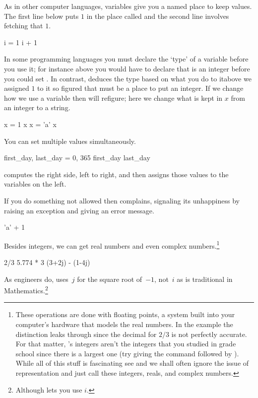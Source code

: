 As in other computer languages, 
variables give you a named place to keep values.
The first line below puts $1$ in the place called 
and the second line involves fetching that $1$.
\begin{pythonconsole}
i = 1
i + 1
\end{pythonconsole}
In some programming languages you must declare the `type' of a variable
before you use it; for instance above you would have to declare 
that  is an integer before you could set .
In contrast, \python{} deduces the type 
based on what you do to it\Dash above we assigned $1$ to it
so \python{} figured that  must be a place to put an integer.
If we change how we use a variable then \python{} will 
refigure; here we change what is kept in $x$ from an integer to a string.
\begin{pythonconsole}
x = 1
x
x = 'a'
x
\end{pythonconsole}

You can set multiple values simultaneously.
\begin{pythonconsole}
first_day, last_day = 0, 365
first_day
last_day   
\end{pythonconsole}
\python{} computes the right side, left to right, and then assigns 
those values to the variables on the left.

If you do something not allowed then 
\python{} complains, signaling its unhappiness by 
raising an exception and giving an error 
message.
\begin{pythonconsole}
'a' + 1
\end{pythonconsole}

Besides integers, we can get real numbers 
and even complex numbers.\footnote{These operations
are done with floating points, a system 
built into your computer's hardware that
models the real numbers.
In the example the distinction leaks through
since the decimal for $2/3$ is not perfectly accurate.
For that matter, \protect\python's integers aren't the integers that you studied
in grade school since there is a largest one (try giving \python{} the 
command \protect{} followed by 
\protect{}). 
While all of this stuff is fascinating\protect\Dash
see \protect\cite{PythonTeam19a} and \protect\cite{Goldberg91}\protect\Dash
we shall often ignore the issue of representation and just call these 
integers, reals, and complex numbers.}
\begin{pythonconsole}
2/3
5.774 * 3
(3+2j) - (1-4j)
\end{pythonconsole}
As engineers do, \python{} uses~$j$ for the square
root of~$-1$, not~$i$ as is traditional in Mathematics.\footnote{%
  Although \protect\Sage{} lets you use $i$.}

